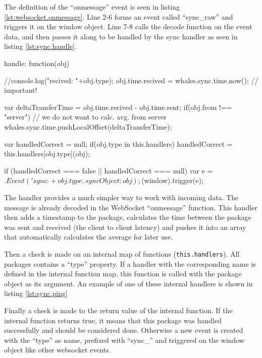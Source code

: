 The definition of the ``onmessage'' event is seen in listing \ref{lst:websocket.onmessage}.
Line 2-6 forms an event called ``sync\_raw'' and triggers it on the window
object.
Line 7-8 calls the decode function on the event data, and then passes it along
to be handled by the sync handler as seen in listing \ref{lst:sync.handle}.

\begin{snippet}[caption=Handling of incoming data,label=lst:sync.handle]
    handle: function(obj) {
        //console.log("recived: "+obj.type);
        obj.time.recived = whales.sync.time.now(); // important!

        var deltaTransferTime = obj.time.recived - obj.time.sent;
        if(obj.from !== "server") { // we do not want to calc. avg. from server
            whales.sync.time.pushLocalOffset(deltaTransferTime);
        }
        
        var handledCorrect = null;
        if(obj.type in this.handlers) {
            handledCorrect = this.handlers[obj.type](obj);
        }
        
        if (handledCorrect === false || handledCorrect === null){
            var e = $.Event('sync_'+obj.type,{
                syncObject:obj
            });
            $(window).trigger(e);
        }
    }
\end{snippet}

The handler provides a much simpler way to work with incoming data. The message is already
decoded in the WebSocket ``onmessage'' function. This handler then
adds a timestamp to the package, calculates the time between the package was sent
and received (the client to client latency) and pushes it into an array that
automatically calculates the average for later use.


Then a check is made on an internal map of functions
(\lstinline$this.handlers$).
All packages contains a ``type'' property. If a handler with the
corresponding name is defined in the internal function map, this function is
called with the package object as its argument. An example of one of these
internal handlers is shown in listing \ref{lst:sync.ping}


Finally a check is made to the return value of the internal function. If the
internal function returns true, it means that this package was handled
successfully and should be considered done.
Otherwise a new event is created with the ``type'' as name, prefixed with
``sync\_'' and triggered on the window object like other websocket events.

